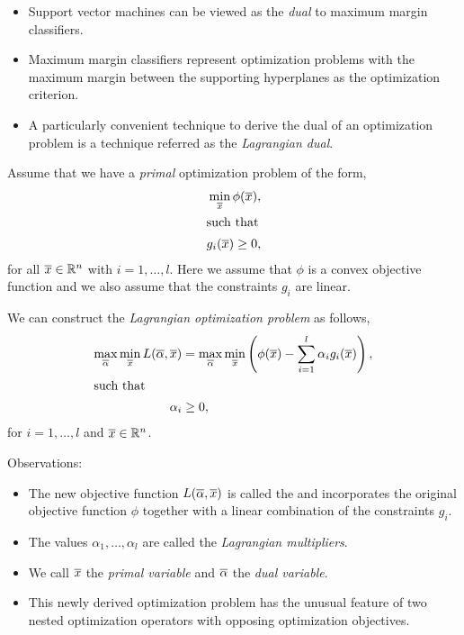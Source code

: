 \documentclass[a4paper,blends,pdf,colorBG,slideColor]{prosper}
\begin{document}
\begin{itemize}
\item Support vector machines can be viewed as the {\em dual} to maximum margin classifiers.
\item Maximum margin classifiers represent optimization problems with the maximum margin
between the supporting hyperplanes as the optimization criterion.
\item A particularly convenient technique to derive the dual of an optimization problem is a
technique referred as the {\em Lagrangian dual}.
\end{itemize}
\es

\small
Assume that we have a {\em primal} optimization problem of the form,
\begin{align*}
\min_{\overline{x}} \phi(\overline{x}), \\
\intertext{such that}
g_i(\overline{x}) \ge 0,
\end{align*}
for all $\overline{x}\in \mathbb{R}^{n}$ with $i = 1,\ldots,l$.  
Here we assume that $\phi$ is a convex objective function and we also assume that
the constraints $g_i$ are linear.

We can construct the {\em Lagrangian optimization problem} as follows,
\begin{align*}
\max_{\overline{\alpha}} \min_{\overline{x}} L(\overline{\alpha},\overline{x})& = \max_{\overline{\alpha}} \min_{\overline{x}}\left( \phi(\overline{x}) - \sum_{i=1}^l \alpha_i g_i(\overline{x})\right ),\\
\intertext{such that}
\alpha_i &\ge 0,
\end{align*}
for  $i = 1,\ldots,l$ and $\overline{x}\in \mathbb{R}^{n}$.  
\es

Observations:
\begin{itemize}
\item The new objective function $L(\overline{\alpha},\overline{x})$ is called
the  and  incorporates the original objective function
$\phi$ together with a linear combination of the constraints $g_i$.
\item The values $\alpha_1,\ldots,\alpha_l$ are called the {\em Lagrangian multipliers}.
\item We call $\overline{x}$ the {\em primal   variable} and $\overline{\alpha}$ the
{\em dual variable}.
\item This newly derived optimization problem has the unusual feature of two nested optimization operators with opposing optimization objectives.
\end{itemize}
\es
\end{document}
